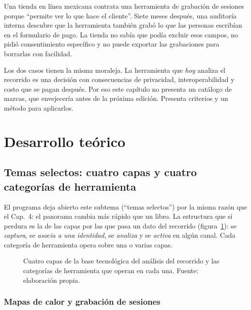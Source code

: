 \begin{casoFicticio}
Una tienda en línea mexicana contrata una herramienta de grabación de sesiones
porque \enquote{permite ver lo que hace el cliente}. Siete meses después,
una auditoría interna descubre que la herramienta también grabó lo que las
personas escribían en el formulario de pago. La tienda no sabía que podía
excluir esos campos, no pidió consentimiento específico y no puede exportar
las grabaciones para borrarlas con facilidad.
\end{casoFicticio}

Los dos casos tienen la misma moraleja. La herramienta que \emph{hoy} analiza
el recorrido es una decisión con consecuencias de privacidad,
interoperabilidad y costo que se pagan después. Por eso este capítulo no
presenta un catálogo de marcas, que envejecería antes de la próxima edición.
Presenta criterios y un método para aplicarlos.

\section{Desarrollo teórico}

\subsection{Temas selectos: cuatro capas y cuatro categorías de herramienta}
\label{sec:cap09-capas}

El programa deja abierto este subtema (\enquote{temas selectos}) por la
misma razón que el Cap.~4: el panorama cambia más rápido que un libro. La
estructura que sí perdura es la de las capas por las que pasa un dato del
recorrido (figura~\ref{fig:cap09-capas}): se \emph{captura}, se \emph{asocia a una
identidad}, se \emph{analiza} y se \emph{activa} en algún canal. Cada
categoría de herramienta opera sobre una o varias capas.

\begin{figure}[!htb]
  \centering
  \resizebox{0.95\textwidth}{!}{}
  \caption{Cuatro capas de la base tecnológica del análisis del recorrido y
  las categorías de herramienta que operan en cada una. Fuente: elaboración
  propia.}
  \label{fig:cap09-capas}
\end{figure}

\subsubsection{Mapas de calor y grabación de sesiones}


